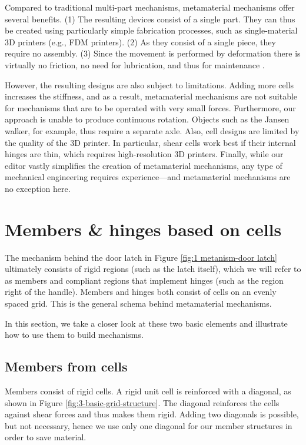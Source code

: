 Compared to traditional multi-part mechanisms, metamaterial mechanisms offer several benefits. (1) The resulting devices consist of a single part. They can thus be created using particularly simple fabrication processes, such as single-material 3D printers (e.g., FDM printers). (2) As they consist of a single piece, they require no assembly. (3) Since the movement is performed by deformation there is virtually no friction, no need for lubrication, and thus for maintenance \cite{Howell2013}.

However, the resulting designs are also subject to limitations. Adding more cells increases the stiffness, and as a result, metamaterial mechanisms are not suitable for mechanisms that are to be operated with very small forces. Furthermore, our approach is unable to produce continuous rotation. Objects such as the Jansen walker, for example, thus require a separate axle. Also, cell designs are limited by the quality of the 3D printer. In particular, shear cells work best if their internal hinges are thin, which requires high-resolution 3D printers. Finally, while our editor vastly simplifies the creation of metamaterial mechanisms, any type of mechanical engineering requires experience---and metamaterial mechanisms are no exception here.


\section{Members \& hinges based on cells}

The mechanism behind the door latch in Figure \ref{fig:1 metanism-door latch} ultimately consists of rigid regions (such as the latch itself), which we will refer to as members and compliant regions that implement hinges (such as the region right of the handle). Members and hinges both consist of cells on an evenly spaced grid. This is the general schema behind metamaterial mechanisms.

In this section, we take a closer look at these two basic elements and illustrate how to use them to build mechanisms. 


\subsection{Members from cells}

Members consist of rigid cells. A rigid unit cell is reinforced with a diagonal, as shown in Figure \ref{fig:3-basic-grid-structure}. The diagonal reinforces the cells against shear forces and thus makes them rigid. Adding two diagonals is possible, but not necessary, hence we use only one diagonal for our member structures in order to save material.

